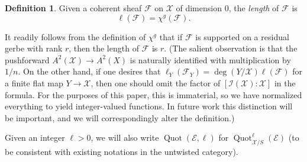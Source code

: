 \documentclass[11pt]{amsart}
\newcommand{\ms}[1]{\mathscr #1}
\DeclareMathOperator{\quot}{Quot}
\renewcommand{\[}{[\!\hspace{0.03em}[}
\renewcommand{\]}{]\!\hspace{0.03em}]}
\renewcommand{\(}{(\!\hspace{0.03em}(}
\renewcommand{\)}{)\!\hspace{0.03em})}
\theoremstyle{definition}
\newtheorem{defn}[lem]{Definition}
\theoremstyle{remark}
\begin{document}
\begin{defn} Given a coherent sheaf $\ms F$ on $\ms X$ of dimension $0$, the \emph{length\/} of $\ms F$ is 
$$\ell(\ms F)=\chi^g(\ms F).$$ 
\end{defn}
It readily follows from the definition of $\chi^g$ that if $\ms F$ is supported on a residual gerbe with rank $r$, then the length of $\ms F$ is $r$.  (The salient observation is that the pushforward $A^2(\ms X)\to A^2(X)$ is naturally identified with multiplication by $1/n$.  On the other hand, if one desires that $\ell_Y(\ms F_Y)=\deg(Y/\ms X)\ell(\ms F)$ for a finite flat map $Y\to\ms X$, then one should omit the factor of $[\ms I(\ms X):\ms X]$ in the formula.  For the purposes of this paper, this is immaterial, so we have normalized everything to yield integer-valued functions.  In future work \cite{orbifoldmoduli} this distinction will be important, and we will correspondingly alter the definition.)

Given an integer $\ell>0$, we will also write $\quot(\ms E,\ell)$ for $\quot^{\ell}_{\ms X/S}(\ms E)$ (to be consistent with existing notations in the untwisted category).
\end{document}
